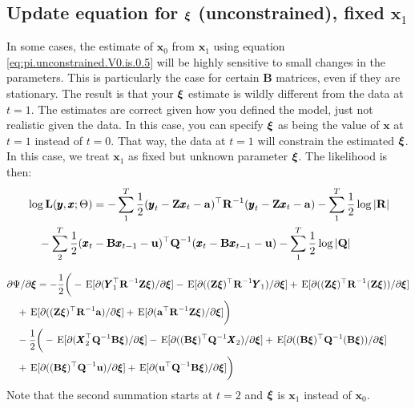 \documentclass[]{article}
\def\xixi{\mbox{\boldmath $\xi$}}
\def\UPS{\mbox{\boldmath $\Upsilon$}}
\def\XI{\mbox{\boldmath $\Xi$}}
\def\BB{\mbox{$\mathbf B$}}	\def\bb{\mbox{$\mathbf b$}} \def\Bb{\mbox{$\mathbf J$}} \def\Ba{\mbox{$\mathbf L$}} \def\Bm{\UPS}
\def\E{\,\textup{\textrm{E}}}
\def\LL{\mbox{$\mathbf L$}}	\def\ll{\mbox{$\mathbf l$}}
\def\QQ{\mbox{$\mathbf Q$}}	 \def\qq{\mbox{$\mathbf q$}} \def\Qb{\mbox{$\mathbf G$}}  \def\Qm{\mathbb{Q}}
\def\RR{\mbox{$\mathbf R$}}	 \def\rr{\mbox{$\mathbf r$}} \def\Rb{\mbox{$\mathbf H$}}	\def\Rm{\mathbb{R}}
\def\XX{\mbox{$\pmb{X}$}}	\def\xx{\mbox{$\pmb{x}$}}
\def\YY{\mbox{$\pmb{Y}$}}	\def\yy{\mbox{$\pmb{y}$}}
\def\ZZ{\mbox{$\mathbf Z$}}	\def\zz{\mbox{$\mathbf z$}}	\def\Zb{\mbox{$\mathbf M$}} \def\Za{\mbox{$\mathbf N$}} \def\Zm{\XI}
\begin{document}
\subsection{Update equation for $\xixi$ (unconstrained), fixed $\xx_1$}\label{sec:xi.unconstrained.x1}
In some cases, the estimate of $\xx_0$ from $\xx_1$ using equation \ref{eq:pi.unconstrained.V0.is.0.5} will be highly sensitive to small changes in the parameters.  This is particularly the case for certain $\BB$ matrices, even if they are stationary.  The result is that your $\xixi$ estimate is wildly different from the data at $t=1$.  The estimates are correct given how you defined the model, just not realistic given the data.  In this case, you can specify $\xixi$ as being the value of $\xx$ at $t=1$ instead of $t=0$.  That way, the data at $t=1$ will constrain the estimated $\xixi$.  In this case, we treat $\xx_1$ as fixed but unknown parameter $\xixi$.  The likelihood is then:
\begin{equation}
\begin{split}
&\log\LL(\yy,\xx ; \Theta) = -\sum_1^T \frac{1}{2}(\yy_t - \ZZ \xx_t - \aa)^\top \RR^{-1} (\yy_t - \ZZ \xx_t - \aa) -\sum_1^T\frac{1}{2} \log |\RR|\\
&\quad  -\sum_2^T \frac{1}{2} (\xx_t - \BB \xx_{t-1} - \uu)^\top \QQ^{-1} (\xx_t - \BB \xx_{t-1} - \uu) - \sum_1^T\frac{1}{2}\log |\QQ|
\end{split}
\end{equation}

\begin{equation}\label{}
\begin{split}
&\partial\Psi/\partial\xixi = -\frac{1}{2} \bigg(-\E[\partial(\YY_1^\top\RR^{-1}\ZZ\xixi)/\partial\xixi] 
 - \E[\partial((\ZZ\xixi)^\top\RR^{-1}\YY_1)/\partial\xixi] + \E[\partial((\ZZ\xixi)^\top\RR^{-1}(\ZZ\xixi))/\partial\xixi] \\
&\quad +  \E[\partial((\ZZ\xixi)^\top\RR^{-1}\aa)/\partial\xixi] 
+ \E[\partial(\aa^\top\RR^{-1}\ZZ\xixi)/\partial\xixi]\bigg)\\
&\quad -\frac{1}{2} \bigg(-\E[\partial(\XX_2^\top\QQ^{-1}\BB\xixi)/\partial\xixi] 
 - \E[\partial((\BB\xixi)^\top\QQ^{-1}\XX_2)/\partial\xixi] + \E[\partial((\BB\xixi)^\top\QQ^{-1}(\BB\xixi))/\partial\xixi] \\
&\quad +  \E[\partial((\BB\xixi)^\top\QQ^{-1}\uu)/\partial\xixi] 
+ \E[\partial(\uu^\top\QQ^{-1}\BB\xixi)/\partial\xixi]\bigg)
\end{split}
\end{equation}
Note that the second summation starts at $t=2$ and $\xixi$ is $\xx_1$ instead of $\xx_0$.
\end{document}
